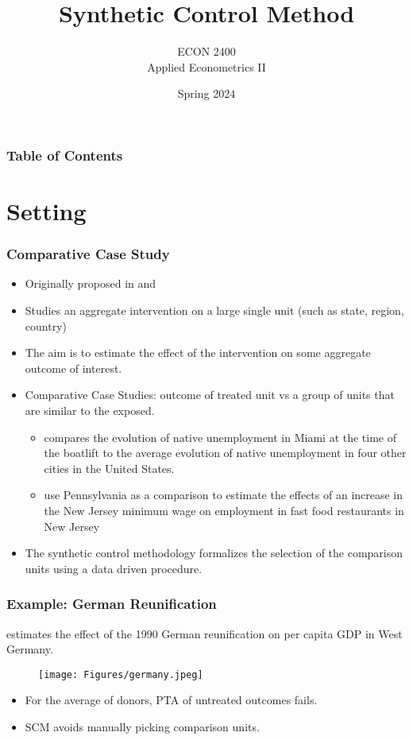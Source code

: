 \documentclass[xcolor=svgnames,t]{beamer}
\title[Synthetic Control Method]{Synthetic Control Method}
\subtitle{}
\author[ECON 2400]{ECON 2400 \\ Applied Econometrics II}
\institute[]{Andres Mena}
\date{Spring 2024}
\newcommand{\myitem}{\item[$\circ$]}
\begin{document}
\begin{frame}
\maketitle
\end{frame}


\begin{frame}
    \frametitle{Table of Contents}
    \tableofcontents
\end{frame}

\section{Setting}
\begin{frame}
\frametitle{Comparative Case Study}
\begin{itemize}
    \item <1-> Originally proposed in \cite{abadie2003economic} and \cite{abadie2010synthetic} 
    \item <2-> Studies an aggregate intervention on a large single unit (such as state, region, country) 
    \item <3-> The aim is to estimate the effect of the intervention on some aggregate outcome of interest.
    \item <4-> Comparative Case Studies: outcome of treated unit vs a group of units that are similar to the exposed.
    \begin{itemize}
        \myitem <5->\cite{card1990impact} compares the evolution of native unemployment in Miami at the
        time of the boatlift to the average evolution of native unemployment in four other cities
        in the United States.
        \myitem <6->\cite{card1994american} use Pennsylvania as a comparison
        to estimate the effects of an increase in the New Jersey minimum wage on employment in fast food restaurants in New Jersey
    \end{itemize}
    \item <7-> The synthetic control methodology formalizes the selection of the comparison units using a data driven procedure.
\end{itemize}
\end{frame}

\begin{frame}
\frametitle{Example: German Reunification}
\cite{abadie2015comparative} estimates the effect of the 1990 German reunification on per
capita GDP in West Germany.
\begin{figure}[htbp]
        \centering
        \texttt{[image: Figures/germany.jpeg]}
        \label{fig:figure1}
\end{figure}
\begin{itemize}
    \item <1-> For the average of donors, PTA of untreated outcomes fails.
    \item <2-> SCM avoids manually picking comparison units.
\end{itemize}
\end{frame}
\end{document}
